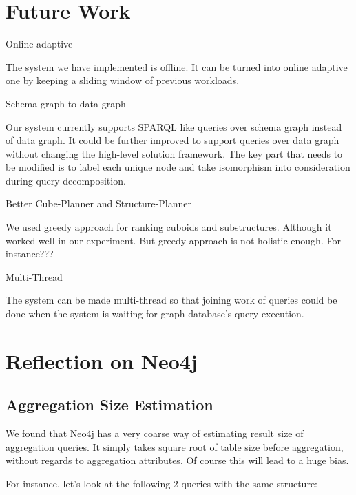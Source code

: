 \section{Future Work}
Online adaptive

The system we have implemented is offline. It can be turned into online adaptive one by keeping a sliding window of previous workloads. 

Schema graph to data graph

Our system currently supports SPARQL like queries over schema graph instead of data graph. It could be further improved to support queries over data graph without changing the high-level solution framework. The key part that needs to be modified is to label each unique node and take isomorphism into consideration during query decomposition.  

Better Cube-Planner and Structure-Planner

We used greedy approach for ranking cuboids and substructures. Although it worked well in our experiment. But greedy approach is not holistic enough. For instance???

Multi-Thread

The system can be made multi-thread so that joining work of queries could be done when the system is waiting for graph database’s query execution. 

\section{Reflection on Neo4j}
\subsection{Aggregation Size Estimation}
We found that Neo4j has a very coarse way of estimating result size of aggregation queries. It simply takes square root of table size before aggregation, without regards to aggregation attributes. Of course this will lead to a huge bias. 

For instance, let’s look at the following 2 queries with the same structure:

